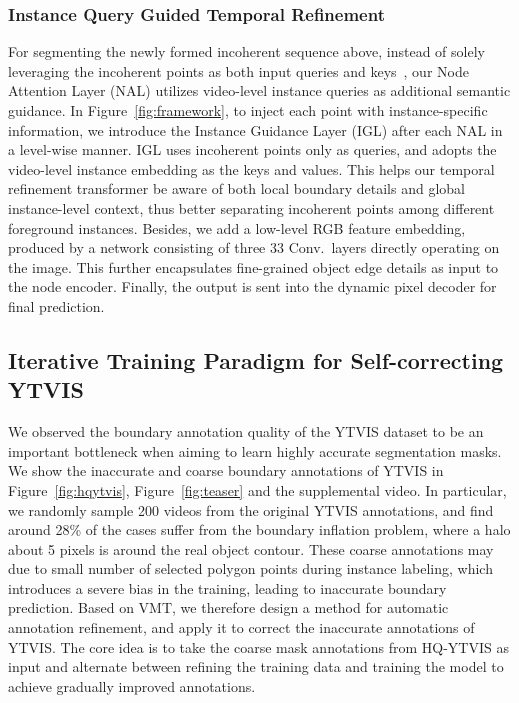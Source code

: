 \documentclass[runningheads]{llncs}
\begin{document}
\subsubsection{Instance Query Guided Temporal Refinement}


For segmenting the newly formed incoherent sequence above, instead of solely leveraging the incoherent points as both input queries and keys~\cite{transfiner}, our Node Attention Layer (NAL) utilizes video-level instance queries as additional semantic guidance. In Figure~\ref{fig:framework}, to inject each point with instance-specific information, we introduce the Instance Guidance Layer (IGL) after each NAL in a level-wise manner. IGL uses incoherent points only as queries, and adopts the video-level instance embedding as the keys and values. This helps our temporal refinement transformer be aware of both
local boundary details and global instance-level context, thus better separating incoherent points among different foreground instances. 
Besides, we add a low-level RGB feature embedding, produced by a network consisting of three 33 Conv.\ layers directly operating on the image. This further encapsulates fine-grained object edge details as input to the node encoder. 
Finally, the output is sent into the dynamic pixel decoder for final prediction. 

\subsection{Iterative Training Paradigm for Self-correcting YTVIS}
\label{sec:loop}

We observed the boundary annotation quality of the YTVIS dataset to be an important bottleneck when aiming to learn highly accurate segmentation masks. 
We show the inaccurate and coarse boundary annotations of YTVIS in Figure~\ref{fig:hqytvis}, Figure~\ref{fig:teaser} and the supplemental video. In particular, we randomly sample 200 videos from the original YTVIS annotations, and find around 28\% of the cases suffer from the boundary inflation problem, where a halo about 5 pixels is around the real object contour. These coarse annotations may due to small number of selected polygon points during instance labeling, which introduces a severe bias in the training, leading to inaccurate boundary prediction.
Based on VMT, we therefore design a method for automatic annotation refinement, and apply it to correct the inaccurate annotations of YTVIS. The core idea is to take the coarse mask annotations from HQ-YTVIS as input and alternate between refining the training data and training the model to achieve gradually improved annotations. 
\end{document}

